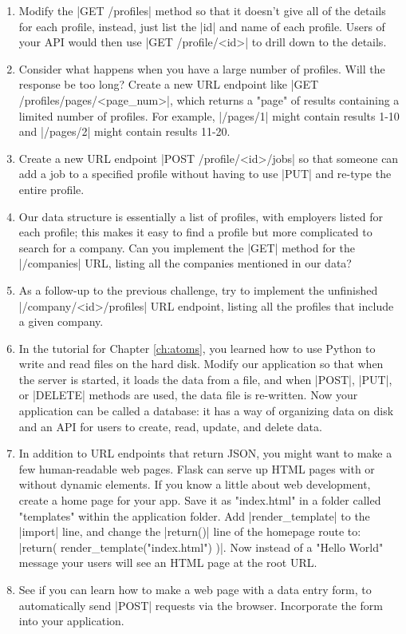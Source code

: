 \documentclass[11pt]{book}
\begin{document}
\begin{enumerate}
    \item Modify the |GET /profiles| method so that it doesn't give all of the details for each profile, instead, just list the |id| and name of each profile.  Users of your API would then use |GET /profile/<id>| to drill down to the details.
    \item Consider what happens when you have a large number of profiles.  Will the response be too long?  Create a new URL endpoint like |GET /profiles/pages/<page_num>|, which returns a "page" of results containing a limited number of profiles.  For example, |/pages/1| might contain results 1-10 and |/pages/2| might contain results 11-20.
    \item Create a new URL endpoint |POST /profile/<id>/jobs| so that someone can add a job to a specified profile without having to use |PUT| and re-type the entire profile.
    \item Our data structure is essentially a list of profiles, with employers listed for each profile; this makes it easy to find a profile but more complicated to search for a company.  Can you implement the |GET| method for the |/companies| URL, listing all the companies mentioned in our data?
    \item As a follow-up to the previous challenge, try to implement the unfinished |/company/<id>/profiles| URL endpoint, listing all the profiles that include a given company.
    \item In the tutorial for Chapter \ref{ch:atoms}, you learned how to use Python to write and read files on the hard disk.  Modify our application so that when the server is started, it loads the data from a file, and when |POST|, |PUT|, or |DELETE| methods are used, the data file is re-written.  Now your application can be called a database: it has a way of organizing data on disk and an API for users to create, read, update, and delete data.
    \item In addition to URL endpoints that return JSON, you might want to make a few human-readable web pages.  Flask can serve up HTML pages with or without dynamic elements.  If you know a little about web development, create a home page for your app.  Save it as "index.html" in a folder called "templates" within the application folder.  Add |render_template| to the |import| line, and change the |return()| line of the homepage route to: |return( render_template("index.html") )|.  Now instead of a "Hello World" message your users will see an HTML page at the root URL.
    \item See if you can learn how to make a web page with a data entry form, to automatically send |POST| requests via the browser.  Incorporate the form into your application.
\end{enumerate}
\end{document}

